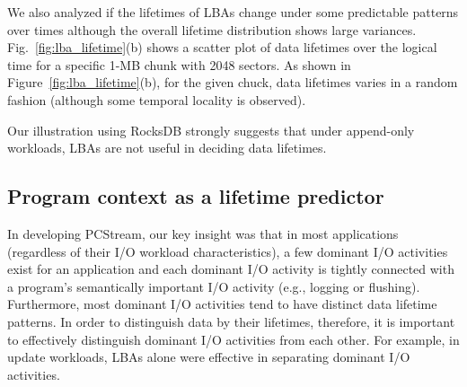 We also analyzed 
if the lifetimes of LBAs change under some predictable patterns over times 
although the overall lifetime distribution shows large variances.
Fig.~\ref{fig:lba_lifetime}(b) shows a scatter plot of data lifetimes over the logical time 
for a specific 1-MB chunk with 2048 sectors. 
As shown in Figure~\ref{fig:lba_lifetime}(b), 
for the given chuck, data lifetimes varies in a random fashion
(although some temporal locality is observed).

Our illustration using RocksDB strongly suggests that under append-only
workloads, LBAs are not useful in deciding data lifetimes.

\vspace{-5pt}
\subsection{Program context as a lifetime predictor}
In developing {\sf PCStream}, our key insight was that in most applications 
(regardless of their I/O workload characteristics), 
a few dominant I/O activities exist for an application
and each dominant I/O activity   
is tightly connected with a program's semantically 
important I/O activity (e.g., logging or flushing).  
Furthermore, most dominant I/O activities tend to have distinct data lifetime patterns.
In order to distinguish data by their lifetimes, therefore, 
it is important to effectively distinguish dominant I/O activities from each other.  
For example, in update workloads, 
LBAs alone were effective in separating dominant I/O activities.  

